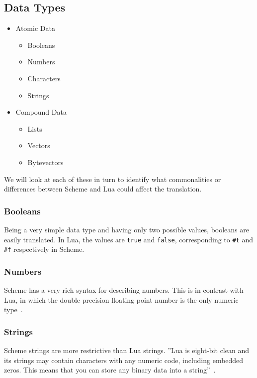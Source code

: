 \subsection{Data Types}

\begin{itemize}
\item Atomic Data
\begin{itemize}
\item Booleans
\item Numbers
\item Characters
\item Strings
\end{itemize}
\item Compound Data
\begin{itemize}
\item Lists
\item Vectors
\item Bytevectors
\end{itemize}
\end{itemize}

We will look at each of these in turn to identify what commonalities or
differences between Scheme and Lua could affect the translation.

\subsubsection{Booleans}

Being a very simple data type and having only two possible values, booleans are
easily translated. In Lua, the values are \texttt{true} and \texttt{false},
corresponding to \texttt{\#t} and \texttt{\#f} respectively in Scheme.

\subsubsection{Numbers}

Scheme has a very rich syntax for describing numbers. This is in contrast with
Lua, in which the double precision floating point number is the only
numeric type~\cite[p.10]{luabook}.

\subsubsection{Strings}

Scheme strings are more restrictive than Lua strings. ''Lua is
eight-bit clean and its strings may contain characters with any numeric code,
including embedded zeros. This means that you can store any binary data into a
string''~\cite[p.11]{luabook}.

